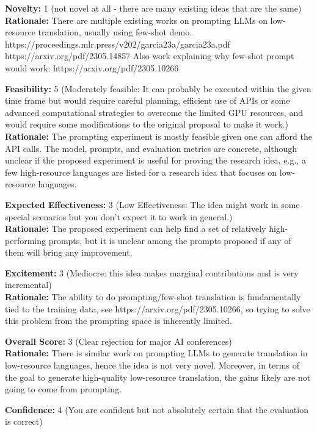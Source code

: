 \newpage

\begin{tcolorbox}[colback=green!10!white, colframe=green!80!black, title=\textbf{Reviewer 2}]
\small
\textbf{Novelty:} 1 (not novel at all - there are many existing ideas that are the same)\\
\textbf{Rationale:} There are multiple existing works on prompting LLMs on low-resource translation, usually using few-shot demo.
https://proceedings.mlr.press/v202/garcia23a/garcia23a.pdf
https://arxiv.org/pdf/2305.14857
Also work explaining why few-shot prompt would work:
https://arxiv.org/pdf/2305.10266

\vspace{10pt}

\textbf{Feasibility:} 5 (Moderately feasible: It can probably be executed within the given time frame but would require careful planning, efficient use of APIs or some advanced computational strategies to overcome the limited GPU resources, and would require some modifications to the original proposal to make it work.)\\
\textbf{Rationale:} The prompting experiment is mostly feasible given one can afford the API calls. The model, prompts, and evaluation metrics are concrete, although unclear if the proposed experiment is useful for proving the research idea, e.g., a few high-resource languages are listed for a research idea that focuses on low-resource languages.

\vspace{10pt}

\textbf{Expected Effectiveness:} 3 (Low Effectiveness: The idea might work in some special scenarios but you don't expect it to work in general.)\\
\textbf{Rationale:} The proposed experiment can help find a set of relatively high-performing prompts, but it is unclear among the prompts proposed if any of them will bring any improvement.

\vspace{10pt}

\textbf{Excitement:} 3 (Mediocre: this idea makes marginal contributions and is very incremental)\\
\textbf{Rationale:} The ability to do prompting/few-shot translation is fundamentally tied to the training data, see https://arxiv.org/pdf/2305.10266, so trying to solve this problem from the prompting space is inherently limited.

\vspace{10pt}

\textbf{Overall Score:} 3 (Clear rejection for major AI conferences)\\
\textbf{Rationale:} There is similar work on prompting LLMs to generate translation in low-resource languages, hence the idea is not very novel. Moreover, in terms of the goal to generate high-quality low-resource translation, the gains likely are not going to come from prompting.

\vspace{10pt}

\textbf{Confidence:} 4 (You are confident but not absolutely certain that the evaluation is correct)
\end{tcolorbox}
